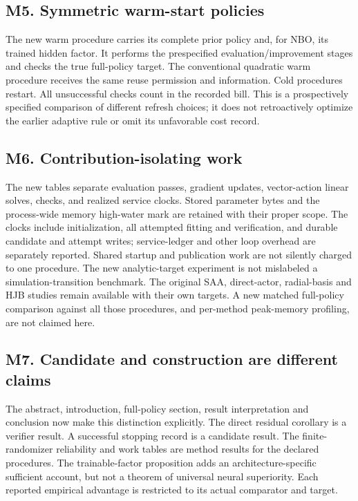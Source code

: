 \subsection*{M5. Symmetric warm-start policies}
The new warm procedure carries its complete prior policy and, for NBO, its
trained hidden factor. It performs the prespecified evaluation/improvement
stages and checks the true full-policy target. The conventional quadratic
warm procedure receives the same reuse permission and information. Cold
procedures restart. All unsuccessful checks count in the recorded bill.
This is a prospectively specified comparison of different refresh choices;
it does not retroactively optimize the earlier adaptive rule or omit its
unfavorable cost record.

\subsection*{M6. Contribution-isolating work}
The new tables separate evaluation passes, gradient updates, vector-action
linear solves, checks, and realized service clocks. Stored parameter bytes
and the process-wide memory high-water mark are retained with their proper
scope. The clocks include initialization, all attempted fitting and
verification, and durable candidate and attempt writes; service-ledger and
other loop overhead are separately reported. Shared startup and publication
work are not silently charged to one procedure. The new analytic-target
experiment is not mislabeled a simulation-transition benchmark. The original
SAA, direct-actor, radial-basis and HJB studies remain available with their
own targets. A new matched full-policy comparison against all those
procedures, and per-method peak-memory profiling, are not claimed here.

\subsection*{M7. Candidate and construction are different claims}
The abstract, introduction, full-policy section, result interpretation and
conclusion now make this distinction explicitly. The direct residual
corollary is a verifier result. A successful stopping record is a candidate
result. The finite-randomizer reliability and work tables are method
results for the declared procedures. The trainable-factor proposition adds
an architecture-specific sufficient account, but not a theorem of universal
neural superiority. Each reported empirical advantage is restricted to its
actual comparator and target.

